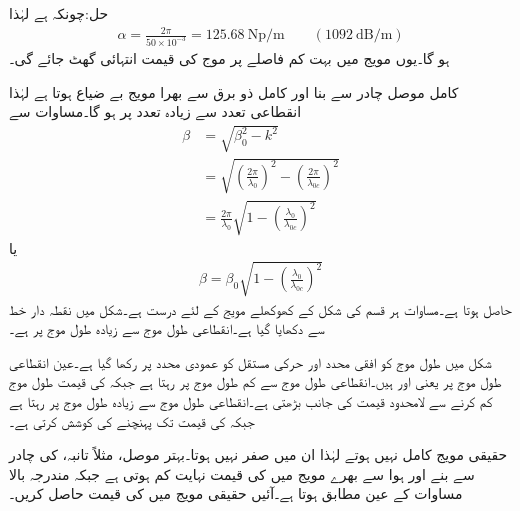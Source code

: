 حل:چونکہ  ہے لہٰذا
\begin{align*}
\alpha=\frac{2\pi}{50\times 10^{-3}}=\SI{125.68}{\neper/\meter} \quad \quad  \left(\SI{1092}{\deci\bel\per\meter}\right)
\end{align*}
ہو گا۔یوں مویج میں بہت کم فاصلے پر موج کی قیمت انتہائی گھٹ جائے گی۔ 

کامل موصل چادر سے بنا اور کامل ذو برق سے بھرا  مویج بے ضیاع ہوتا ہے لہٰذا انقطاعی تعدد سے زیادہ  تعدد پر  ہو گا۔مساوات  سے 
\begin{align*}
\beta&=\sqrt{\beta_0^2-k^2}\\
&=\sqrt{\left(\frac{2\pi}{\lambda_0}\right)^2-\left(\frac{2\pi}{\lambda_{0c}}\right)^2}\\
&=\frac{2\pi}{\lambda_0}\sqrt{1-\left(\frac{\lambda_0}{\lambda_{0c}}\right)^2}
\end{align*}
یا
\begin{align}\label{مساوات_مویج_زاویائی_مستقل_عمومی_مساوات}
\beta=\beta_0\sqrt{1-\left(\frac{\lambda_0}{\lambda_{0c}}\right)^2}
\end{align}
حاصل ہوتا ہے۔مساوات  ہر قسم کی  شکل کے کھوکھلے مویج کے لئے درست ہے۔شکل  میں نقطہ دار خط سے  دکھایا گیا ہے۔انقطاعی طول موج سے زیادہ طول موج پر  ہے۔

شکل  میں طول موج کو افقی محدد اور حرکی مستقل کو عمودی محدد پر رکھا گیا ہے۔عین انقطاعی طول موج  پر  یعنی  اور  ہیں۔انقطاعی طول موج سے کم طول موج پر  رہتا ہے جبکہ  کی قیمت طول موج کم کرنے سے لامحدود قیمت کی جانب بڑھتی ہے۔انقطاعی طول موج سے زیادہ طول موج پر  رہتا ہے جبکہ  کی قیمت  تک پہنچنے کی کوشش کرتی ہے۔

حقیقی مویج کامل نہیں ہوتے لہٰذا ان میں  صفر نہیں ہوتا۔بہتر موصل، مثلاً تانبہ، کی چادر سے بنے اور ہوا سے بھرے مویج میں  کی قیمت نہایت کم ہوتی ہے جبکہ  مندرجہ بالا مساوات کے عین مطابق ہوتا ہے۔آئیں حقیقی مویج میں  کی قیمت حاصل کریں۔

